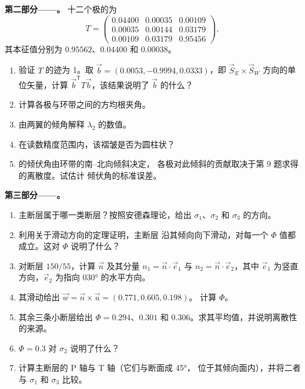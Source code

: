 \begin{problem}
\medskip\noindent\textbf{第二部分——。}
十二个极的为
\[
  T = \begin{pmatrix} 0.04400 & 0.00035 & 0.00109\\ 0.00035 & 0.00144 & 0.03179\\
  0.00109 & 0.03179 & 0.95456 \end{pmatrix},
\]
其本征值分别为 $0.95562$、$0.04400$ 和 $0.00038$。
\begin{enumerate}[resume]
  \item 验证 $T$ 的迹为 1。取 $\vec b = (0.0053, -0.9994,
        0.0333)$，即 $\vec S_E\times\vec S_W$ 方向的单位矢量，计算
        $\vec b^{\mathsf T}T\vec b$，该结果说明了 $\vec b$ 的什么？
  \item 计算各极与环带之间的方均根夹角。
  \item 由两翼的倾角解释 $\lambda_2$ 的数值。
  \item 在读数精度范围内，该褶皱是否为圆柱状？
  \item {}的倾伏角由环带的南–北向倾斜决定，
        各极对此倾斜的贡献取决于第 9 题求得的离散度。试估计
        倾伏角的标准误差。
\end{enumerate}

\medskip\noindent\textbf{第三部分——。}
\begin{enumerate}[resume]
  \item 主断层属于哪一类断层？按照安德森理论，给出
        $\sigma_1$、$\sigma_2$ 和 $\sigma_3$ 的方向。
  \item 利用关于滑动方向的定理证明，主断层
        沿其倾向向下滑动，对每一个 $\Phi$ 值都成立。这对
        $\Phi$ 说明了什么？
  \item 对断层 $150/55$，计算 $\vec n$ 及其分量 $n_1 =
        \vec n\cdot\vec e_1$ 与 $n_2 = \vec n\cdot\vec e_2$，其中 $\vec e_1$
        为竖直方向，$\vec e_2$ 为指向 \ang{030} 的水平方向。
  \item 其滑动给出 $\vec w = \vec n\times\vec u = (0.771, 0.605, 0.198)$。
        计算 $\Phi$。
  \item 其余三条小断层给出 $\Phi = 0.294$、$0.301$ 和
        $0.306$。求其平均值，并说明离散性的来源。
  \item $\Phi = 0.3$ 对 $\sigma_2$ 说明了什么？
  \item 计算主断层的 P 轴与 T 轴（它们与断面成 \ang{45}，
        位于其倾向面内），并将二者与 $\sigma_1$ 和
        $\sigma_3$ 比较。
\end{enumerate}


\end{problem}
